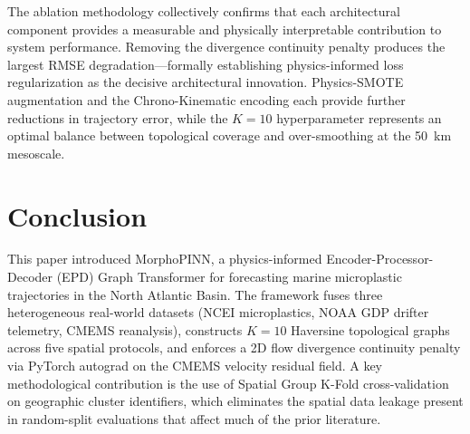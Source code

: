 \documentclass[conference]{IEEEtran}
\begin{document}
\begin{table}[htbp]
\caption{Ablation Study at the 50~km Protocol (bootstrap-mean results from \texttt{run\_ablation.py})}
\label{tab:ablation}
\begin{center}
\end{center}
\end{table}

The ablation methodology collectively confirms that each architectural component provides a measurable and physically interpretable contribution to system performance. Removing the divergence continuity penalty produces the largest RMSE degradation---formally establishing physics-informed loss regularization as the decisive architectural innovation. Physics-SMOTE augmentation and the Chrono-Kinematic encoding each provide further reductions in trajectory error, while the $K=10$ hyperparameter represents an optimal balance between topological coverage and over-smoothing at the 50~km mesoscale.


\section{Conclusion}

This paper introduced MorphoPINN, a physics-informed Encoder-Processor-Decoder (EPD) Graph Transformer for forecasting marine microplastic trajectories in the North Atlantic Basin. The framework fuses three heterogeneous real-world datasets (NCEI microplastics, NOAA GDP drifter telemetry, CMEMS reanalysis), constructs $K=10$ Haversine topological graphs across five spatial protocols, and enforces a 2D flow divergence continuity penalty via PyTorch autograd on the CMEMS velocity residual field. A key methodological contribution is the use of Spatial Group K-Fold cross-validation on geographic cluster identifiers, which eliminates the spatial data leakage present in random-split evaluations that affect much of the prior literature.
\end{document}
